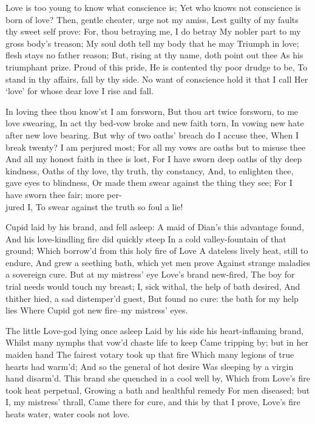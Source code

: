 \documentclass[twocolumn]{book}
\begin{document}
Love is too young to know what conscience is;
Yet who knows not conscience is born of love?
Then, gentle cheater, urge not my amiss,
Lest guilty of my faults thy sweet self prove:
For, thou betraying me, I do betray
My nobler part to my gross body's treason;
My soul doth tell my body that he may
Triumph in love; flesh stays no father reason;
But, rising at thy name, doth point out thee
As his triumphant prize. Proud of this pride,
He is contented thy poor drudge to be,
To stand in thy affairs, fall by thy side.
  No want of conscience hold it that I call
  Her `love' for whose dear love I rise and fall.

In loving thee thou know'st I am forsworn,
But thou art twice forsworn, to me love swearing,
In act thy bed-vow broke and new faith torn,
In vowing new hate after new love bearing.
But why of two oaths' breach do I accuse thee,
When I break twenty? I am perjured most;
For all my vows are oaths but to misuse thee
And all my honest faith in thee is lost,
For I have sworn deep oaths of thy deep kindness,
Oaths of thy love, thy truth, thy constancy,
And, to enlighten thee, gave eyes to blindness,
Or made them swear against the thing they see;
  For I have sworn thee fair; more per-\\jured I,
  To swear against the truth so foul a lie!


Cupid laid by his brand, and fell asleep:
A maid of Dian's this advantage found,
And his love-kindling fire did quickly steep
In a cold valley-fountain of that ground;
Which borrow'd from this holy fire of Love
A dateless lively heat, still to endure,
And grew a seething bath, which yet men prove
Against strange maladies a sovereign cure.
But at my mistress' eye Love's brand new-fired,
The boy for trial needs would touch my breast;
I, sick withal, the help of bath desired,
And thither hied, a sad distemper'd guest,
  But found no cure: the bath for my help lies
  Where Cupid got new fire--my mistress' eyes.


The little Love-god lying once asleep
Laid by his side his heart-inflaming brand,
Whilst many nymphs that vow'd chaste life to keep
Came tripping by; but in her maiden hand
The fairest votary took up that fire
Which many legions of true hearts had warm'd;
And so the general of hot desire
Was sleeping by a virgin hand disarm'd.
This brand she quenched in a cool well by,
Which from Love's fire took heat perpetual,
Growing a bath and healthful remedy
For men diseased; but I, my mistress' thrall,
  Came there for cure, and this by that I prove,
  Love's fire heats water, water cools not love.
\end{document}
